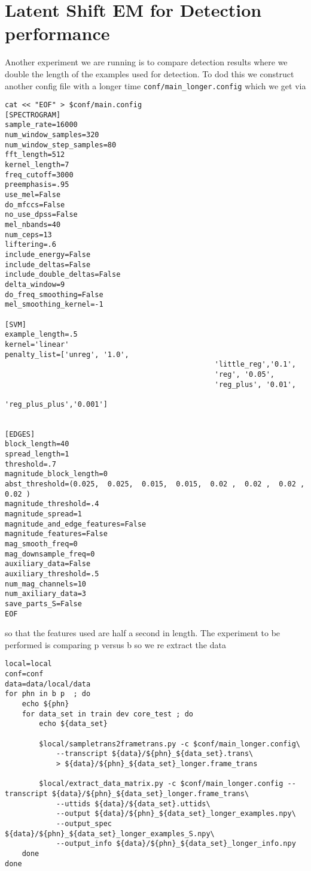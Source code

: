 \documentclass{article}
\begin{document}
\section{Latent Shift EM for Detection performance}
Another experiment we are running is to compare detection results where we double the length of the examples used for detection.
To dod this we construct another config file with a longer time
\texttt{conf/main\_longer.config}
which we get via
\begin{verbatim}
cat << "EOF" > $conf/main.config
[SPECTROGRAM]
sample_rate=16000
num_window_samples=320
num_window_step_samples=80
fft_length=512
kernel_length=7
freq_cutoff=3000
preemphasis=.95
use_mel=False
do_mfccs=False
no_use_dpss=False
mel_nbands=40
num_ceps=13
liftering=.6
include_energy=False
include_deltas=False
include_double_deltas=False
delta_window=9
do_freq_smoothing=False
mel_smoothing_kernel=-1

[SVM]
example_length=.5
kernel='linear'
penalty_list=['unreg', '1.0',
                                                 'little_reg','0.1',
                                                 'reg', '0.05',
                                                 'reg_plus', '0.01',
                                                 'reg_plus_plus','0.001']


[EDGES]
block_length=40
spread_length=1
threshold=.7
magnitude_block_length=0
abst_threshold=(0.025,  0.025,  0.015,  0.015,  0.02 ,  0.02 ,  0.02 ,  0.02 )
magnitude_threshold=.4
magnitude_spread=1
magnitude_and_edge_features=False
magnitude_features=False
mag_smooth_freq=0
mag_downsample_freq=0
auxiliary_data=False
auxiliary_threshold=.5
num_mag_channels=10
num_axiliary_data=3
save_parts_S=False
EOF

\end{verbatim}
so that the features used are half a second in length. The experiment
to be performed is comparing p versus b so we re extract the
data
\begin{verbatim}
local=local
conf=conf
data=data/local/data
for phn in b p  ; do
    echo ${phn}
    for data_set in train dev core_test ; do
        echo ${data_set}

        $local/sampletrans2frametrans.py -c $conf/main_longer.config\
            --transcript ${data}/${phn}_${data_set}.trans\
            > ${data}/${phn}_${data_set}_longer.frame_trans

        $local/extract_data_matrix.py -c $conf/main_longer.config --transcript ${data}/${phn}_${data_set}_longer.frame_trans\
            --uttids ${data}/${data_set}.uttids\
            --output ${data}/${phn}_${data_set}_longer_examples.npy\
            --output_spec ${data}/${phn}_${data_set}_longer_examples_S.npy\
            --output_info ${data}/${phn}_${data_set}_longer_info.npy
    done
done

\end{verbatim}
\end{document}
